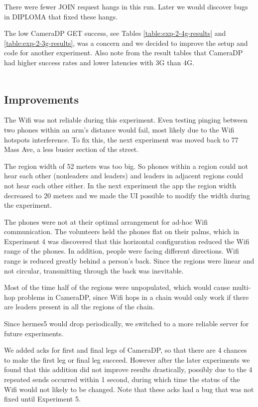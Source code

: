 There were fewer JOIN request hangs in this run. Later we would discover bugs in DIPLOMA that fixed these hangs.

The low CameraDP GET success, see Tables \ref{table:exp-2-4g-results} and \ref{table:exp-2-3g-results}, was a concern and we decided to improve the setup and code for another experiment. Also note from the result tables that CameraDP had higher success rates and lower latencies with 3G than 4G.
\\
\\
\subsection{Improvements}
The Wifi was not reliable during this experiment. Even testing pinging between two phones within an arm's distance would fail, most likely due to the Wifi hotspots interference. To fix this, the next experiment was moved back to 77 Mass Ave, a less busier section of the street.

The region width of 52 meters was too big. So phones within a region could not hear each other (nonleaders and leaders) and leaders in adjacent regions could not hear each other either. In the next experiment the app the region width decreased to 20 meters and we made the UI possible to modify the width during the experiment.

The phones were not at their optimal arrangement for ad-hoc Wifi communication. The volunteers held the phones flat on their palms, which in Experiment 4 was discovered that this horizontal configuration reduced the Wifi range of the phones. In addition, people were facing different directions. Wifi range is reduced greatly behind a person's back. Since the regions were linear and not circular, transmitting through the back was inevitable.

Most of the time half of the regions were unpopulated, which would cause multi-hop problems in CameraDP, since Wifi hops in a chain would only work if there are leaders present in all the regions of the chain.

Since hermes5 would drop periodically, we switched to a more reliable server for future experiments.

We added acks for first and final legs of CameraDP, so that there are 4 chances to make the first leg or final leg succeed. However after the later experiments we found that this addition did not improve results drastically, possibly due to the 4 repeated sends occurred within 1 second, during which time the status of the Wifi would not likely to be changed. Note that these acks had a bug that was not fixed until Experiment 5.

